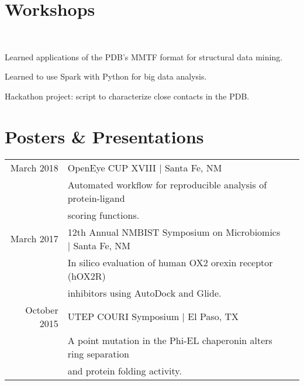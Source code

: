 \documentclass[]{deedy-resume-openfont}
\begin{document}
\begin{minipage}[t]{0.66\textwidth}
\section{Workshops}
\\
\begin{tightemize}
\item Learned applications of the PDB's MMTF format for structural data mining.
\item Learned to use Spark with Python for big data analysis. \item Hackathon project:  script to characterize close contacts in the PDB. \end{tightemize}
\sectionsep


\section{Posters \& Presentations} 
\begin{tabular}{rll}
March 2018      & OpenEye CUP XVIII | Santa Fe, NM \\
                & Automated workflow for reproducible analysis of protein-ligand \\
                & scoring functions.\\
March 2017      & 12th Annual NMBIST Symposium on Microbiomics | Santa Fe, NM \\
                & In silico evaluation of human OX2 orexin receptor (hOX2R) \\
                & inhibitors using AutoDock and Glide. \\
October 2015    & UTEP COURI Symposium | El Paso, TX \\
                & A point mutation in the Phi-EL chaperonin alters ring separation \\
                & and protein folding activity. \\
\end{tabular}
\sectionsep

\end{minipage} 
\end{document}
